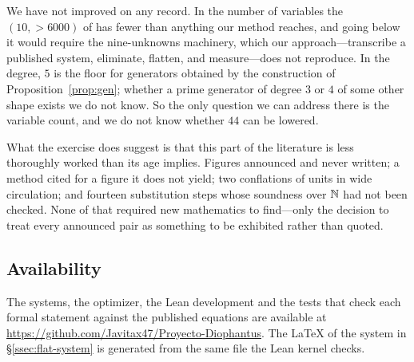 We have not improved on any record. In the number of variables the
$(10,>6000)$ of \cite{matiyasevich1981} has fewer than anything our method
reaches, and going below it would require the nine-unknowns machinery, which our
approach---transcribe a published system, eliminate, flatten, and measure---does
not reproduce. In the degree, $5$ is the floor for generators obtained by the
construction of Proposition~\ref{prop:gen}; whether a prime generator of degree
$3$ or $4$ of some other shape exists we do not know. So the only question we
can address there is the variable count, and we do not know whether $44$ can be
lowered.

What the exercise does suggest is that this part of the literature is less
thoroughly worked than its age implies. Figures announced and never written;
a method cited for a figure it does not yield; two conflations of units in wide
circulation; and fourteen substitution steps whose soundness over $\mathbb{N}$ had not
been checked. None of that required new mathematics to find---only the decision
to treat every announced pair as something to be exhibited rather than quoted.

\subsection*{Availability}

The systems, the optimizer, the Lean development and the tests that check each
formal statement against the published equations are available at
\url{https://github.com/Javitax47/Proyecto-Diophantus}. The \LaTeX{} of the
system in \S\ref{ssec:flat-system} is generated from the same file the Lean
kernel checks.
